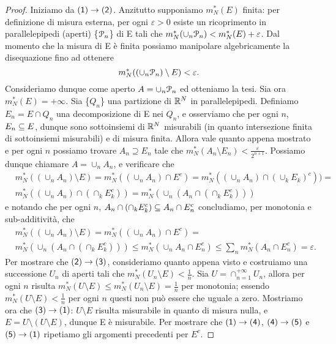 \documentclass[Completo.tex]{subfiles}
\begin{document}
\begin{proof}
	Iniziamo da $\sf[(1)] \ra \sf[(2)]$. Anzitutto supponiamo $m_N^{*}(E)$ finita: per definizione di misura esterna, per ogni $\varepsilon > 0$ esiste un ricoprimento in parallelepipedi (aperti) \{$\eu[P]_n$\} di E tali che $m_N^{*}(\cup_{n} \eu[P]_n) < m_N^{*}(E) + \varepsilon$. Dal momento che la misura di E è finita possiamo manipolare algebricamente la disequazione fino ad ottenere
	\begin{equation*}
	m_N^{*}((\cup_{n} \eu[P]_n) \setminus E) < \varepsilon.
	\end{equation*}
	Consideriamo dunque come aperto $A = \cup_{n} \eu[P]_n$ ed otteniamo la tesi. Sia ora $m_N^{*}(E) = +\infty$. Sia \{$Q_n$\} una partizione di $\bb[R]^{N}$ in parallelepipedi. Definiamo $E_n = E \cap Q_n$ una decomposizione di E nei $Q_n$, e osserviamo che per ogni $n$, $E_n \subseteq E$, dunque sono sottoinsiemi di $\bb[R]^{N}$ misurabili (in quanto intersezione finita di sottoinsiemi misurabili) e di misura finita. Allora vale quanto appena mostrato e per ogni $n$ possiamo trovare $A_n \supseteq E_n$ tale che $m_N^{*}(A_n \setminus E_n) < \frac{\varepsilon}{2^{n+1}}$. Possiamo dunque chiamare $A = \cup_{n} A_n$, e verificare che
	\begin{align*}
	& m_N^{*}((\cup_{n} A_n) \setminus E) = m_N^{*}((\cup_{n} A_n) \cap E^{c}) = m_N^{*}((\cup_{n} A_n) \cap (\cup_{k} E_k)^{c})) = \\
	& m_N^{*}((\cup_{n} A_n) \cap (\cap_{k} E_k^{c})) = m_N^{*}(\cup_{n} (A_n \cap (\cap_{k} E_k^{c})))
	\end{align*}
	e notando che per ogni $n$, $A_n \cap (\cap_{k} E_k^{c}) \subseteq A_n \cap E_n^{c}$ concludiamo, per monotonia e sub-additività, che
	\begin{align*}
	& m_N^{*}((\cup_{n} A_n) \setminus E) = m_N^{*}((\cup_{n} A_n) \cap E^{c}) = \\
	&m_N^{*}(\cup_{n} (A_n \cap (\cap_{k} E_k^{c}))) \leq m_N^{*}(\cup_{n} A_n \cap E_n^{c}) \leq \sum_{n} m_N^{*}(A_n \cap E_n^{c}) = \varepsilon.
	\end{align*}
	Per mostrare che $\sf[(2)] \ra \sf[(3)]$, consideriamo quanto appena visto e costruiamo una successione $U_n$ di aperti tali che $m_N^{*}(U_n \setminus E) < \frac{1}{n}$. Sia $U = \cap_{n=1}^{+\infty} U_n$, allora per ogni $n$ risulta $m_N^{*}(U \setminus E) \leq m_N^{*}(U_n \setminus E) = \frac{1}{n}$ per monotonia; essendo $m_N^{*}(U \setminus E) < \frac{1}{n}$ per ogni $n$ questi non può essere che uguale a zero. Mostriamo ora che $\sf[(3)] \ra \sf[(1)]$: $U \setminus E$ risulta misurabile in quanto di misura nulla, e $E = U \setminus (U \setminus E)$, dunque E è misurabile. Per mostrare che $\sf[(1)] \ra \sf[(4)]$, $\sf[(4)] \ra \sf[(5)]$ e $\sf[(5)] \ra \sf[(1)]$ ripetiamo gli argomenti precedenti per $E^{c}$.
\end{proof}
\end{document}

